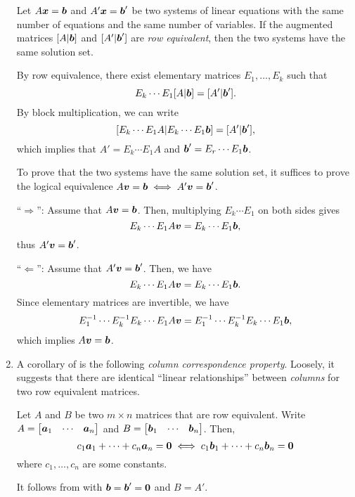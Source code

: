 \begin{enumerate}
\begin{theorem}
\label{thm:row-equiv-same-sol}
Let \(A\vb*{x}=\vb*{b}\) and \(A'\vb*{x}=\vb*{b}'\) be two systems of
linear equations with the same number of equations and the same number of
variables. If the augmented matrices \([A|\vb*{b}]\) and \([A'|\vb*{b}']\) are
\emph{row equivalent}, then the two systems have the same solution set.
\end{theorem}
\begin{pf}
By row equivalence, there exist elementary matrices \(E_1,\dotsc,E_k\) such
that
\[
E_k\dotsb E_1[A|\vb*{b}]=[A'|\vb*{b}'].
\]
By block multiplication, we can write
\[
[E_k\dotsb E_1A|E_k\dotsb E_1\vb*{b}]=[A'|\vb*{b}'],
\]
which implies that \(A'=E_{k}\dotsb E_1A\) and \(\vb*{b}'=E_{r}\dotsb E_1\vb*{b}\).

To prove that the two systems have the same solution set, it suffices to prove
the logical equivalence \(A\vb*{v}=\vb*{b}\iff A'\vb*{v}=\vb*{b}'\).

``\(\Rightarrow\)'': Assume that \(A\vb*{v}=\vb*{b}\). Then, multiplying
\(E_k\dotsb E_1\) on both sides gives
\[
E_{k}\dotsb E_1A\vb*{v}=E_{k}\dotsb E_1\vb*{b},
\]
thus \(A'\vb*{v}=\vb*{b}'\).

``\(\Leftarrow\)'': Assume that \(A'\vb*{v}=\vb*{b}'\). Then, we have
\[
E_{k}\dotsb E_1A\vb*{v}=E_{k}\dotsb E_1\vb*{b}.
\]
Since elementary matrices are invertible, we have
\[
E_{1}^{-1}\dotsb E_{k}^{-1}E_{k}\dotsb E_1A\vb*{v}=E_{1}^{-1}\dotsb E_{k}^{-1}E_{k}\dotsb E_1\vb*{b},
\]
which implies \(A\vb*{v}=\vb*{b}\).
\end{pf}

\item A corollary of  is the following
\emph{column correspondence property}. Loosely, it suggests that there are
identical ``linear relationships'' between \emph{columns} for two row
equivalent matrices.

\begin{corollary}
\label{cor:col-correspond}
Let \(A\) and \(B\) be two \(m\times n\) matrices that are row equivalent.
Write \(A=\mqty[\vect{a}_{1}&\cdots&\vect{a}_{n}]\) and
\(B=\mqty[\vect{b}_{1}&\cdots&\vect{b}_{n}]\). Then,
\[
c_1\vb*{a}_{1}+\dotsb+c_n\vb*{a}_{n}=\vb*{0}\iff
c_1\vb*{b}_{1}+\dotsb+c_n\vb*{b}_{n}=\vb*{0}
\]
where \(c_1,\dotsc,c_n\) are some constants.
\end{corollary}
\begin{pf}
It follows from  with
\(\vb*{b}=\vb*{b}'=\vb*{0}\) and \(B=A'\).
\end{pf}


\end{enumerate}
